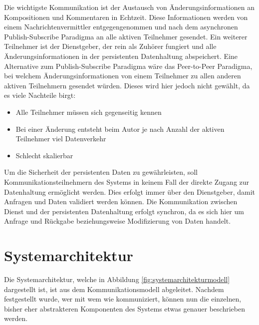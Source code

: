 \documentclass[12pt]{scrartcl}
\begin{document}
Die wichtigste Kommunikation ist der Austausch von Änderungsinformationen an Kompositionen und Kommentaren in Echtzeit. Diese Informationen werden von einem Nachrichtenvermittler entgegengenommen und nach dem asynchronen Publish-Subscribe Paradigma an alle aktiven Teilnehmer gesendet. Ein weiterer Teilnehmer ist der Dienstgeber, der rein als Zuhörer fungiert und alle Änderungsinformationen in der persistenten Datenhaltung abspeichert. Eine Alternative zum Publish-Subscribe Paradigma wäre das Peer-to-Peer Paradigma, bei welchem Änderungsinformationen von einem Teilnehmer zu allen anderen aktiven Teilnehmern gesendet würden. Dieses wird hier jedoch nicht gewählt, da es viele Nachteile birgt:
\begin{itemize}
\item Alle Teilnehmer müssen sich gegenseitig kennen
\item Bei einer Änderung entsteht beim Autor je nach Anzahl der aktiven Teilnehmer viel Datenverkehr
\item Schlecht skalierbar
\end{itemize}



Um die Sicherheit der persistenten Daten zu gewährleisten, soll Kommunikationsteilnehmern des Systems in keinem Fall der direkte Zugang zur Datenhaltung ermöglicht werden. Dies erfolgt immer über den Dienstgeber, damit Anfragen und Daten validiert werden können. Die Kommunikation zwischen Dienst und der persistenten Datenhaltung erfolgt synchron, da es sich hier um Anfrage und Rückgabe beziehungsweise Modifizierung von Daten handelt.



\section{Systemarchitektur}






Die Systemarchitektur, welche in Abbildung \ref{fig:systemarchitekturmodell} dargestellt ist, ist aus dem Kommunikationsmodell abgeleitet. Nachdem festgestellt wurde, wer mit wem wie kommuniziert, können nun die einzelnen, bisher eher abstrakteren Komponenten des Systems etwas genauer beschrieben werden.
\end{document}
